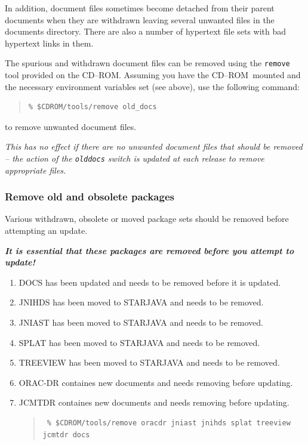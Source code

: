 \documentclass[twoside,11pt]{article}
\renewcommand{\_}{\texttt{\symbol{95}}}
\newcommand{\cdrom}{CD--ROM}
\newcommand{\cdrom}{CD-ROM}
\begin{document}
In addition, document files sometimes become detached from their
parent documents when they are withdrawn leaving several unwanted
files in the documents directory.  There are also a number of hypertext
file sets with bad hypertext links in them.

The spurious and withdrawn document files can be removed using the
\texttt{remove} tool provided on the \cdrom.  Assuming you have the
\cdrom\ mounted and the necessary environment variables set (see above),
use the following command:

\begin{quote}
\begin{verbatim}
% $CDROM/tools/remove old_docs
\end{verbatim}
\end{quote}

to remove unwanted document files.

\textit{This has no effect if there are no unwanted document files
that should be removed -- the action of the \texttt{old\_docs} switch is
updated at each release to remove appropriate files.}

\subsubsection{Remove old and obsolete packages}


 Various withdrawn, obsolete or moved package sets should be removed before 
 attempting an update.   

 \textit{\textbf{It is essential that these packages are removed 
 before you attempt to update!}}

 \begin{enumerate}

 \item DOCS has been updated and needs to be removed before it is updated.

 \item JNIHDS has been moved to STARJAVA and needs to be removed.

 \item JNIAST has been moved to STARJAVA and needs to be removed.

 \item SPLAT has been moved to STARJAVA and needs to be removed.

 \item TREEVIEW has been moved to STARJAVA and needs to be removed.

 \item ORAC-DR containes new documents and needs removing before updating.

 \item JCMTDR containes new documents and needs removing before updating.

 \begin{quote}
 \begin{verbatim}
 % $CDROM/tools/remove oracdr jniast jnihds splat treeview jcmtdr docs
 \end{verbatim}
 \end{quote}

 \end{enumerate}
\end{document}
